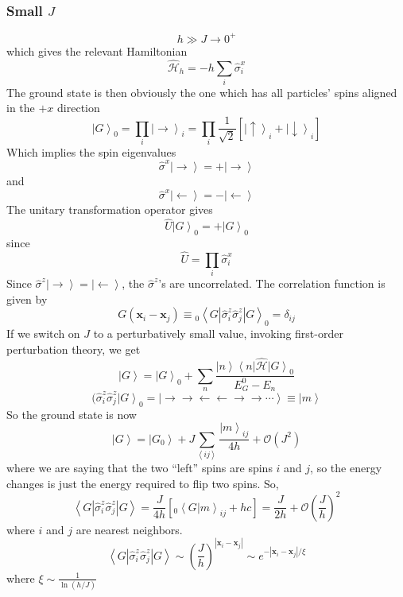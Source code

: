 \documentclass{article}
\begin{document}
	\subsubsection{Small $J$}
	$$h\gg J\rightarrow 0^+$$
	which gives the relevant Hamiltonian
	$$\hat{\mathcal{H}}_h=-h\sum_i\hat{\sigma}_i^x$$
	The ground state is then obviously the one which has all particles' spins aligned in the $+x$ direction
	$$\left|G\right>_0=\prod_i\left|\rightarrow\right>_i=\prod_i\frac{1}{\sqrt{2}}\left[\left|\uparrow\right>_i+\left|\downarrow\right>_i\right]$$
	Which implies the spin eigenvalues
	$$\hat{\sigma}^x\left|\rightarrow\right>=+\left|\rightarrow\right>$$
	and
	$$\hat{\sigma}^x\left|\leftarrow\right>=-\left|\leftarrow\right>$$
	The unitary transformation operator gives 
	$$\hat{U}\left|G\right>_0=+\left|G\right>_0$$
	since
	$$\hat{U}=\prod_i\hat{\sigma}_i^x$$
	Since $\hat{\sigma}^z\left|\rightarrow\right>=\left|\leftarrow\right>$, the $\hat{\sigma}^z$'s are uncorrelated. The correlation function is given by
	$$G(\mathbf{x}_i-\mathbf{x}_j)\equiv {_0\left<G\left|\hat{\sigma}_i^z\hat{\sigma}_j^z\right|G\right>_0}=\delta_{ij}$$
	If we switch on $J$ to a perturbatively small value, invoking first-order perturbation theory, we get
	$$\left|G\right>=\left|G\right>_0+\sum_n\frac{\left|n\right>\left<n\right|\hat{\mathcal{H}}\left|G\right>_0}{E_G^0-E_n}$$
	$$(\hat{\sigma}_i^z\hat{\sigma}_j^z\left|G\right>_0=\left|\rightarrow\rightarrow\leftarrow\leftarrow\rightarrow\rightarrow\cdots\right>\equiv\left|m\right>$$
	So the ground state is now
	$$\left|G\right>=\left|G_0\right>+J\sum_{\left<ij\right>}\frac{\left|m\right>_{ij}}{4h}+\mathcal{O}(J^2)$$
	where we are saying that the two ``left'' spins are spins $i$ and $j$, so the energy changes is just the energy required to flip two spins.
	So,
	$$\left<G\left|\hat{\sigma}_i^z\hat{\sigma}_j^z\right|G\right>=\frac{J}{4h}\left[{_0\left<G|m\right>_{ij}}+hc\right]=\frac{J}{2h}+\mathcal{O}\left(\frac{J}{h}\right)^2$$
	where $i$ and $j$ are nearest neighbors.
	$$\left<G\left|\hat{\sigma}_i^z\hat{\sigma}_j^z\right|G\right>\sim\left(\frac{J}{h}\right)^{\left|\mathbf{x}_i-\mathbf{x}_j\right|}\sim e^{-\left|\mathbf{x}_i-\mathbf{x}_j\right|/\xi}$$
	where $\xi\sim\frac{1}{\ln(h/J)}$
\end{document}
